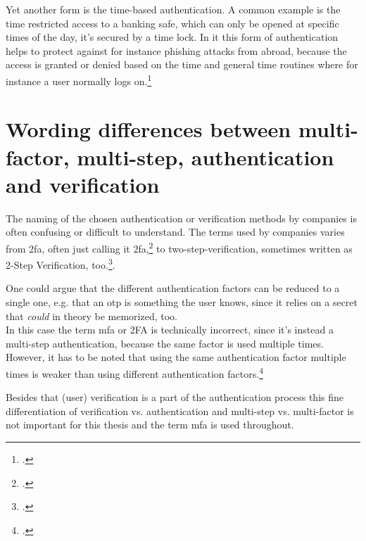 Yet another form is the time-based authentication. A common example is the time restricted access to a banking safe, which can only be opened at specific times of the day, it's secured by a time lock. In \gls{it} this form of authentication helps to protect against for instance phishing attacks from abroad, because the access is granted or denied based on the time and general time routines where for instance a user normally logs on.\footcite[See][191]{dasgupta2017multi}

\section{Wording differences between multi-factor, multi-step, authentication and verification}

The naming of the chosen authentication or verification methods by companies is often confusing or difficult to understand. The terms used by companies varies from \gls{2fa}, often just calling it \gls{2fa},\footcite{apple_2fa} to two-step-verification, sometimes written as 2-Step Verification, too.\footcites[][]{apple_s2v}[][]{playstation}[][]{google_2-step_verification}[][]{microsoft_2sv}.

One could argue that the different authentication factors can be reduced to a single one, e.g. that an \gls{otp} is \frqq something the user knows\flqq{}, since it relies on a secret that \textit{could} in theory be memorized, too.\\
In this case the term \gls{mfa} or 2FA is technically incorrect, since it's instead a multi-step authentication, because the same factor is used multiple times. However, it has to be noted that using the same authentication factor multiple times is weaker than using different authentication factors.\footcite[See][117]{grimes2017hacking}

Besides that (user) verification is a part of the authentication process this fine differentiation of verification vs. authentication and multi-step vs. multi-factor is not important for this thesis and the term \gls{mfa} is used throughout.

